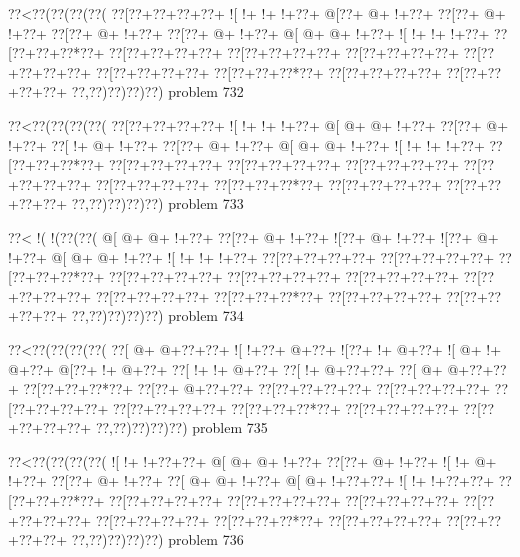 \vbox{\vbox{\goo
\0??<\0??(\0??(\0??(\0??(
\0??[\0??+\0??+\0??+\0??+
\- ![\- !+\- !+\- !+\0??+
\- @[\0??+\- @+\- !+\0??+
\0??[\0??+\- @+\- !+\0??+
\0??[\0??+\- @+\- !+\0??+
\0??[\0??+\- @+\- !+\0??+
\- @[\- @+\- @+\- !+\0??+
\- ![\- !+\- !+\- !+\0??+
\0??[\0??+\0??+\0??*\0??+
\0??[\0??+\0??+\0??+\0??+
\0??[\0??+\0??+\0??+\0??+
\0??[\0??+\0??+\0??+\0??+
\0??[\0??+\0??+\0??+\0??+
\0??[\0??+\0??+\0??+\0??+
\0??[\0??+\0??+\0??*\0??+
\0??[\0??+\0??+\0??+\0??+
\0??[\0??+\0??+\0??+\0??+
\0??,\0??)\0??)\0??)\0??)
}
\hfil problem 732\hfil\break
}

\vbox{\vbox{\goo
\0??<\0??(\0??(\0??(\0??(
\0??[\0??+\0??+\0??+\0??+
\- ![\- !+\- !+\- !+\0??+
\- @[\- @+\- @+\- !+\0??+
\0??[\0??+\- @+\- !+\0??+
\0??[\- !+\- @+\- !+\0??+
\0??[\0??+\- @+\- !+\0??+
\- @[\- @+\- @+\- !+\0??+
\- ![\- !+\- !+\- !+\0??+
\0??[\0??+\0??+\0??*\0??+
\0??[\0??+\0??+\0??+\0??+
\0??[\0??+\0??+\0??+\0??+
\0??[\0??+\0??+\0??+\0??+
\0??[\0??+\0??+\0??+\0??+
\0??[\0??+\0??+\0??+\0??+
\0??[\0??+\0??+\0??*\0??+
\0??[\0??+\0??+\0??+\0??+
\0??[\0??+\0??+\0??+\0??+
\0??,\0??)\0??)\0??)\0??)
}
\hfil problem 733\hfil\break
}

\vbox{\vbox{\goo
\0??<\- !(\- !(\0??(\0??(
\- @[\- @+\- @+\- !+\0??+
\0??[\0??+\- @+\- !+\0??+
\- ![\0??+\- @+\- !+\0??+
\- ![\0??+\- @+\- !+\0??+
\- @[\- @+\- @+\- !+\0??+
\- ![\- !+\- !+\- !+\0??+
\0??[\0??+\0??+\0??+\0??+
\0??[\0??+\0??+\0??+\0??+
\0??[\0??+\0??+\0??*\0??+
\0??[\0??+\0??+\0??+\0??+
\0??[\0??+\0??+\0??+\0??+
\0??[\0??+\0??+\0??+\0??+
\0??[\0??+\0??+\0??+\0??+
\0??[\0??+\0??+\0??+\0??+
\0??[\0??+\0??+\0??*\0??+
\0??[\0??+\0??+\0??+\0??+
\0??[\0??+\0??+\0??+\0??+
\0??,\0??)\0??)\0??)\0??)
}
\hfil problem 734\hfil\break
}

\vbox{\vbox{\goo
\0??<\0??(\0??(\0??(\0??(
\0??[\- @+\- @+\0??+\0??+
\- ![\- !+\0??+\- @+\0??+
\- ![\0??+\- !+\- @+\0??+
\- ![\- @+\- !+\- @+\0??+
\- @[\0??+\- !+\- @+\0??+
\0??[\- !+\- !+\- @+\0??+
\0??[\- !+\- @+\0??+\0??+
\0??[\- @+\- @+\0??+\0??+
\0??[\0??+\0??+\0??*\0??+
\0??[\0??+\- @+\0??+\0??+
\0??[\0??+\0??+\0??+\0??+
\0??[\0??+\0??+\0??+\0??+
\0??[\0??+\0??+\0??+\0??+
\0??[\0??+\0??+\0??+\0??+
\0??[\0??+\0??+\0??*\0??+
\0??[\0??+\0??+\0??+\0??+
\0??[\0??+\0??+\0??+\0??+
\0??,\0??)\0??)\0??)\0??)
}
\hfil problem 735\hfil\break
}

\vbox{\vbox{\goo
\0??<\0??(\0??(\0??(\0??(
\- ![\- !+\- !+\0??+\0??+
\- @[\- @+\- @+\- !+\0??+
\0??[\0??+\- @+\- !+\0??+
\- ![\- !+\- @+\- !+\0??+
\0??[\0??+\- @+\- !+\0??+
\0??[\- @+\- @+\- !+\0??+
\- @[\- @+\- !+\0??+\0??+
\- ![\- !+\- !+\0??+\0??+
\0??[\0??+\0??+\0??*\0??+
\0??[\0??+\0??+\0??+\0??+
\0??[\0??+\0??+\0??+\0??+
\0??[\0??+\0??+\0??+\0??+
\0??[\0??+\0??+\0??+\0??+
\0??[\0??+\0??+\0??+\0??+
\0??[\0??+\0??+\0??*\0??+
\0??[\0??+\0??+\0??+\0??+
\0??[\0??+\0??+\0??+\0??+
\0??,\0??)\0??)\0??)\0??)
}
\hfil problem 736\hfil\break
}

